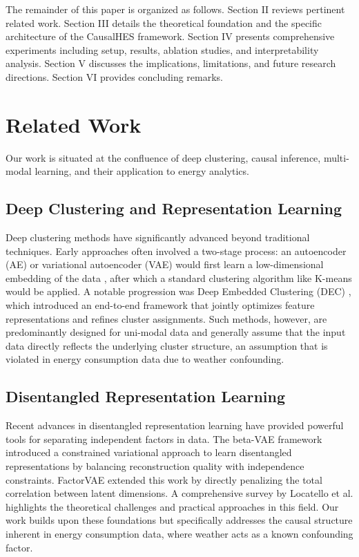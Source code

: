 \documentclass[journal]{IEEEtran}
\begin{document}
The remainder of this paper is organized as follows. Section II reviews pertinent related work. Section III details the theoretical foundation and the specific architecture of the CausalHES framework. Section IV presents comprehensive experiments including setup, results, ablation studies, and interpretability analysis. Section V discusses the implications, limitations, and future research directions. Section VI provides concluding remarks.


\section{Related Work}
Our work is situated at the confluence of deep clustering, causal inference, multi-modal learning, and their application to energy analytics.

\subsection{Deep Clustering and Representation Learning}
Deep clustering methods have significantly advanced beyond traditional techniques. Early approaches often involved a two-stage process: an autoencoder (AE) or variational autoencoder (VAE) would first learn a low-dimensional embedding of the data \cite{autoencoder_representation_learning}, after which a standard clustering algorithm like K-means would be applied. A notable progression was Deep Embedded Clustering (DEC) \cite{deep_embedding_clustering_xie}, which introduced an end-to-end framework that jointly optimizes feature representations and refines cluster assignments. Such methods, however, are predominantly designed for uni-modal data and generally assume that the input data directly reflects the underlying cluster structure, an assumption that is violated in energy consumption data due to weather confounding.

\subsection{Disentangled Representation Learning}
Recent advances in disentangled representation learning have provided powerful tools for separating independent factors in data. The beta-VAE framework \cite{beta_vae} introduced a constrained variational approach to learn disentangled representations by balancing reconstruction quality with independence constraints. FactorVAE \cite{factor_vae} extended this work by directly penalizing the total correlation between latent dimensions. A comprehensive survey by Locatello et al. \cite{disentangled_survey} highlights the theoretical challenges and practical approaches in this field. Our work builds upon these foundations but specifically addresses the causal structure inherent in energy consumption data, where weather acts as a known confounding factor.
\end{document}
